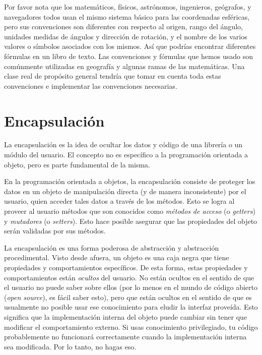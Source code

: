 Por favor nota que los matemáticos, físicos, astrónomos, ingenieros, geógrafos, y navegadores todos usan el mismo sistema
básico para las coordenadas esféricas, pero sus convenciones
son diferentes con respecto al origen, rango del ángulo, 
unidades medidas de ángulos y dirección de rotación, y el nombre de los varios valores o símbolos asociados con los mismos. 
Así que podrías encontrar diferentes fórmulas en un libro de
texto. Las convenciones y fórmulas que hemos usado son comúnmente
utilizadas en geografía y algunas ramas de las matemáticas. Una clase real de propósito general tendría que tomar en cuenta toda estas convenciones e implementar las convenciones necesarias.

\section{Encapsulación}

La encapsulación es la idea de ocultar los datos y código 
de una librería o un módulo del usuario. El concepto no es
específico a la programación orientada a objeto, pero 
es parte fundamental de la misma.

En la programación orientada a objetos, la encapsulación 
consiste de proteger los datos en un objeto de manipulación
directa (y de manera inconsistente) por el usuario, quien 
acceder tales datos a través de los métodos. Esto se logra al
proveer al usuario métodos que son conocidos como \emph{métodos 
de acceso} (o \emph{getters}) y \emph{mutadores} (o \emph{setters}).
Esto hace posible asegurar que las propiedades del objeto 
serán validadas por sus métodos. 


La encapsulación es una forma poderosa de abstracción
y abstracción procedimental. Visto desde afuera, un
objeto es una caja negra que tiene propiedades y 
comportamientos específicos. De esta forma, estas propiedades
y comportamientos están \emph{ocultos} del usuario. 
No están ocultos en el sentido de que el usuario no puede
saber sobre ellos (por lo menos en el mundo de código 
abierto (\emph{open source}), es fácil saber esto), pero
que están ocultos en el sentido de que es usualmente no posible
usar ese conocimiento para eludir la interfaz proveída.
Esto significa que la implementación interna del objeto 
puede cambiar sin tener que modificar el comportamiento
externo. Si usas conocimiento privilegiado, tu código
probablemente no funcionará correctamente cuando la 
implementación interna sea modificada. Por lo tanto,
no hagas eso.

